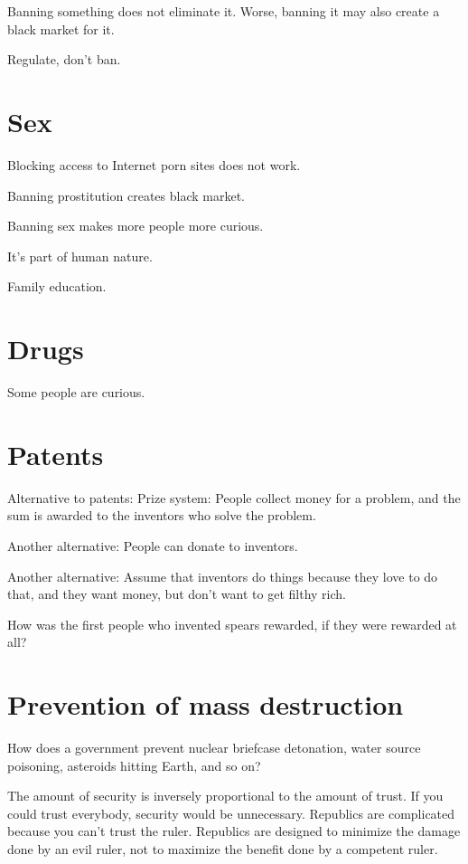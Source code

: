 Banning something does not eliminate it.
Worse, banning it may also create a black market for it.

Regulate, don't ban.

\section{Sex}

Blocking access to Internet porn sites does not work.

Banning prostitution creates black market.

Banning sex makes more people more curious.

It's part of human nature.

Family education.

\section{Drugs}

Some people are curious.

\section{Patents}

Alternative to patents:
Prize system:
People collect money for a problem,
and the sum is awarded to the inventors who solve the problem.

Another alternative: People can donate to inventors.

Another alternative: Assume that inventors do things
because they love to do that, and they want money, but don't want to get filthy rich.

How was the first people who invented spears rewarded,
if they were rewarded at all?

\section{Prevention of mass destruction}

How does a government prevent
nuclear briefcase detonation,
water source poisoning,
asteroids hitting Earth,
and so on?

The amount of security is inversely proportional to the amount of trust.
If you could trust everybody, security would be unnecessary.
Republics are complicated because you can't trust the ruler.
Republics are designed to minimize the damage done by an evil ruler,
not to maximize the benefit done by a competent ruler.

